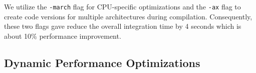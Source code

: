We utilize the \texttt{-march} flag for CPU-specific optimizations and the \texttt{-ax} flag to create code versions for multiple architectures during compilation. Consequently, these two flags gave reduce the overall integration time by 4 seconds which is about 10\% performance improvement. 


\subsection{Dynamic Performance Optimizations}






